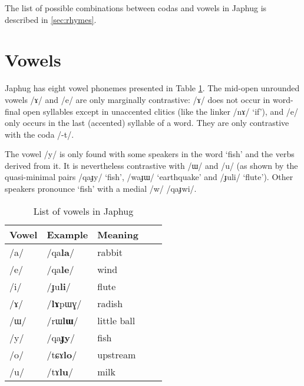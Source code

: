 \documentclass[oneside,a4paper,11pt]{article}
\newcommand{\ipa}[1]{\mbox{\phon/#1/}}
\newcommand{\ipab}[1]{{\phon#1}}
\begin{document}
    
    The list of possible combinations between codas and vowels in Japhug is described in \ref{sec:rhymes}.
    
     \section*{Vowels} \label{sec:vowels}
     
     
     Japhug has eight vowel phonemes presented in Table \ref{tab:vowels}. The mid-open unrounded vowels \ipa{ɤ} and \ipa{e} are only marginally contrastive: \ipa{ɤ} does not occur in word-final open syllables except in unaccented clitics (like the linker \ipa{nɤ} `if'), and \ipa{e} only occurs in the last (accented) syllable of a word. They are only contrastive with the coda \ipa{-t}.
     
The vowel \ipa{y} is only found with some speakers in the word `fish' and the verbs derived from it. It is nevertheless contrastive with \ipa{ɯ} and \ipa{u} (as shown by the quasi-minimal pairs \ipa{qaɟy} `fish', \ipa{waɟɯ} `earthquake' and \ipa{ɟuli} `flute'). Other speakers pronounce `fish' with a medial \ipa{w} \ipa{qaɟwi}.
     
     \begin{table}
 \caption{List of vowels in Japhug} \label{tab:vowels}  \centering
     \begin{tabular}{lllll}
     \toprule
Vowel & Example & Meaning \\
\midrule
\ipa{a} &	\ipa{qa\textbf{la}} & rabbit\\
\ipa{e} &	\ipa{qa\textbf{le}} &wind\\
\ipa{i} &	\ipa{ɟu\textbf{li}} &flute\\
\ipa{ɤ} &	\ipa{\textbf{lɤ}pɯɣ} & radish\\
\ipa{ɯ} &	\ipa{rɯ\textbf{lɯ}} &little ball\\
\ipa{y} &	\ipa{qa\textbf{ɟy}} &fish\\
\ipa{o} &	\ipa{tɕɤ\textbf{lo}} &upstream\\
\ipa{u} &	\ipa{tɤ\textbf{lu}} &milk\\
     \bottomrule
     \end{tabular}
     \end{table}
     
     		\begin{vowel}
    		\putcvowel[l]{\ipab{ɤ}}{7}
    		\putcvowel[l]{\ipab{ɯ}}{8}
		\end{vowel}
     
\end{document}
